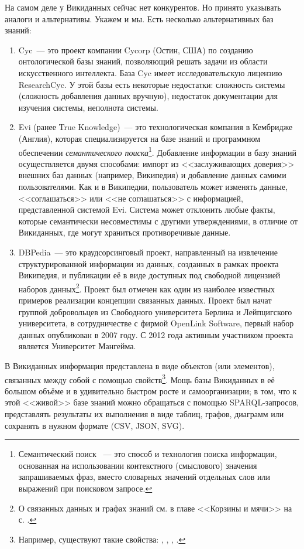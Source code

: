 На самом деле у Викиданных сейчас нет конкурентов. Но принято указывать аналоги и альтернативы. Укажем и мы. Есть несколько альтернативных баз знаний:
\begin{enumerate}
\item Cyc~--- это проект компании Cycorp (Остин, США) по созданию онтологической базы знаний, позволяющий решать задачи из области искусственного интеллекта\autocite{Cyc}. База Cyc имеет исследовательскую лицензию ResearchCyc. У этой базы есть некоторые недостатки: сложность системы (сложность добавления данных
вручную), недостаток документации для изучения системы, неполнота системы.
\item Evi (ранее True Knowledge\autocite{True_Knowledge})~--- это технологическая компания в Кембридже (Англия), которая специализируется на базе знаний и программном обеспечении \textit{семантического поиска}\footnote[][5pt]{Семантический поиск ~---  это способ и технология поиска информации, основанная на использовании контекстного (смыслового) значения запрашиваемых фраз, вместо словарных значений отдельных слов или выражений при поисковом запросе.}. Добавление информации в базу знаний осуществляется двумя способами: импорт из <<заслуживающих доверия>> внешних баз данных (например, Википедия) и добавление данных самими пользователями. Как и в Википедии, пользователь может изменять
данные, <<соглашаться>> или <<не соглашаться>> с информацией, представленной системой Evi. Система может отклонить любые факты, которые семантически несовместимы с другими утверждениями, в отличие от Викиданных, где могут
храниться противоречивые данные.
\item DBPedia~--- это краудсорсинговый проект, направленный на извлечение структурированной информации из данных, созданных в рамках проекта Википедия, и публикации её в виде доступных под свободной лицензией наборов данных\footnote[][]{О связанных данных и графах знаний см. в главе <<Корзины и мячи>> на с. \pageref{ch:BucketsAndBalls}.}. Проект был отмечен как один из наиболее известных примеров реализации концепции связанных данных.
Проект был начат группой добровольцев из Свободного университета Берлина и Лейпцигского университета, в сотрудничестве с фирмой OpenLink Software, первый набор данных опубликован в 2007 году. С 2012 года активным участником проекта является Университет Мангейма.
\end{enumerate}
В Викиданных информация представлена в виде объектов (или элементов), 
связанных между собой с помощью свойств\footnote{%
%
Например, существуют такие свойства: , 
, , .%
%
}. Мощь базы Викиданных в её большом объёме и в удивительно быстром росте и самоорганизации; в том, что к этой <<живой>> базе знаний можно обращаться с помощью  SPARQL-запросов, представлять результаты их выполнения в виде таблиц, графов, диаграмм или сохранять в нужном формате (CSV, JSON, SVG).

